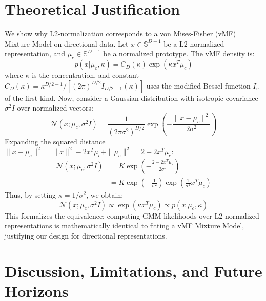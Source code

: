 \documentclass{article}
\theoremstyle{plain}
\theoremstyle{definition}
\theoremstyle{remark}
\begin{document}
\section{Theoretical Justification}
\label{sec:theory}

We show why L2-normalization corresponds to a von Mises-Fisher (vMF) Mixture Model on directional data. Let $x \in \mathbb{S}^{D-1}$ be a L2-normalized representation, and $\mu_c \in \mathbb{S}^{D-1}$ be a normalized prototype. The vMF density is:
\vspace{-3pt}
\begin{equation}
p(x | \mu_c, \kappa) = C_D(\kappa) \exp\left( \kappa x^T \mu_c \right)
\end{equation}
\vspace{-3pt}
where $\kappa$ is the concentration, and constant $C_D(\kappa) = \kappa^{D/2 - 1} / [(2\pi)^{D/2} I_{D/2 - 1}(\kappa)]$ uses the modified Bessel function $I_v$ of the first kind. Now, consider a Gaussian distribution with isotropic covariance $\sigma^2 I$ over normalized vectors:
\vspace{-3pt}
\begin{equation}
\mathcal{N}(x; \mu_c, \sigma^2 I) = \frac{1}{(2\pi\sigma^2)^{D/2}} \exp\left( -\frac{\|x - \mu_c\|^2}{2\sigma^2} \right)
\end{equation}
\vspace{-3pt}
Expanding the squared distance $\|x - \mu_c\|^2 = \|x\|^2 - 2x^T\mu_c + \|\mu_c\|^2 = 2 - 2x^T\mu_c$:
\vspace{-3pt}
\begin{align}
\mathcal{N}(x; \mu_c, \sigma^2 I) &= K \exp\left( -\frac{2 - 2 x^T \mu_c}{2\sigma^2} \right) \\
&= K \exp\left( -\frac{1}{\sigma^2} \right) \exp\left( \frac{1}{\sigma^2} x^T \mu_c \right)
\end{align}
\vspace{-3pt}
Thus, by setting $\kappa = 1/\sigma^2$, we obtain:
\vspace{-3pt}
\begin{equation}
\mathcal{N}(x; \mu_c, \sigma^2 I) \propto \exp\left( \kappa x^T \mu_c \right) \propto p(x | \mu_c, \kappa)
\end{equation}
\vspace{-3pt}
This formalizes the equivalence: computing GMM likelihoods over L2-normalized representations is mathematically identical to fitting a vMF Mixture Model, justifying our design for directional representations.

\section{Discussion, Limitations, and Future Horizons}
\label{sec:discussion}
\end{document}
